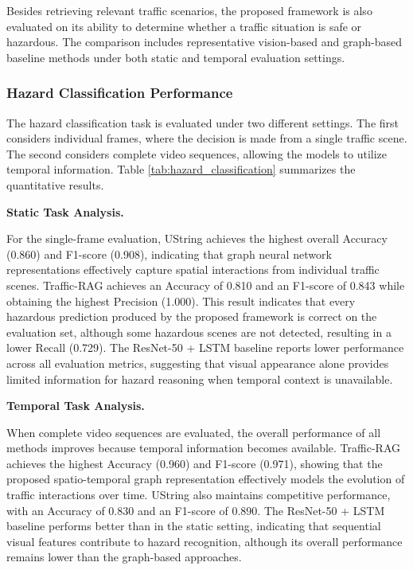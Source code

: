 \documentclass[a4paper, 11pt]{article} %
\begin{document}
Besides retrieving relevant traffic scenarios, the proposed framework is also evaluated on its ability to determine whether a traffic situation is safe or hazardous. The comparison includes representative vision-based and graph-based baseline methods under both static and temporal evaluation settings.

\subsubsection{Hazard Classification Performance}

The hazard classification task is evaluated under two different settings. The first considers individual frames, where the decision is made from a single traffic scene. The second considers complete video sequences, allowing the models to utilize temporal information. Table \ref{tab:hazard_classification} summarizes the quantitative results.


\textbf{Static Task Analysis.}

For the single-frame evaluation, UString achieves the highest overall Accuracy (0.860) and F1-score (0.908), indicating that graph neural network representations effectively capture spatial interactions from individual traffic scenes. Traffic-RAG achieves an Accuracy of 0.810 and an F1-score of 0.843 while obtaining the highest Precision (1.000). This result indicates that every hazardous prediction produced by the proposed framework is correct on the evaluation set, although some hazardous scenes are not detected, resulting in a lower Recall (0.729). The ResNet-50 + LSTM baseline reports lower performance across all evaluation metrics, suggesting that visual appearance alone provides limited information for hazard reasoning when temporal context is unavailable.

\textbf{Temporal Task Analysis.}

When complete video sequences are evaluated, the overall performance of all methods improves because temporal information becomes available. Traffic-RAG achieves the highest Accuracy (0.960) and F1-score (0.971), showing that the proposed spatio-temporal graph representation effectively models the evolution of traffic interactions over time. UString also maintains competitive performance, with an Accuracy of 0.830 and an F1-score of 0.890. The ResNet-50 + LSTM baseline performs better than in the static setting, indicating that sequential visual features contribute to hazard recognition, although its overall performance remains lower than the graph-based approaches.
\end{document}
